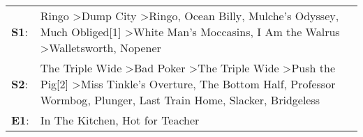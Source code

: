 \begin{supertabular}{p{0.03\textwidth}p{0.92\textwidth}}
 \textbf{S1}:  &                                                              Ringo\textsuperscript{} \textgreater \enspace Dump City\textsuperscript{} \textgreater \enspace Ringo\textsuperscript{}, \enspace Ocean Billy\textsuperscript{}, \enspace Mulche's Odyssey\textsuperscript{}, \enspace Much Obliged[1]\textsuperscript{} \textgreater \enspace White Man's Moccasins\textsuperscript{}, \enspace I Am the Walrus\textsuperscript{} \textgreater \enspace Walletsworth\textsuperscript{}, \enspace Nopener\textsuperscript{}  \enspace  \\
 \textbf{S2}:  &  The Triple Wide\textsuperscript{} \textgreater \enspace Bad Poker\textsuperscript{} \textgreater \enspace The Triple Wide\textsuperscript{} \textgreater \enspace Push the Pig[2]\textsuperscript{} \textgreater \enspace Miss Tinkle's Overture\textsuperscript{}, \enspace The Bottom Half\textsuperscript{}, \enspace Professor Wormbog\textsuperscript{}, \enspace Plunger\textsuperscript{}, \enspace Last Train Home\textsuperscript{}, \enspace Slacker\textsuperscript{}, \enspace Bridgeless\textsuperscript{}  \enspace  \\
 \textbf{E1}:  &                                                                                                                                                                                                                                                                                                                                                                                                                                             In The Kitchen\textsuperscript{}, \enspace Hot for Teacher\textsuperscript{}  \enspace  \\
\end{supertabular}
